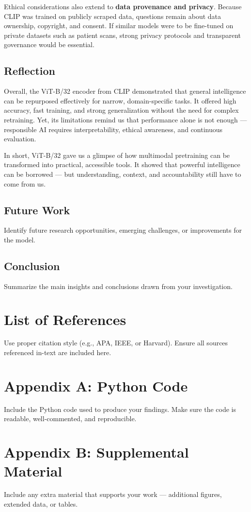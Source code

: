 \documentclass[12pt]{article}
\begin{document}
Ethical considerations also extend to \textbf{data provenance and privacy}. Because CLIP was trained on publicly scraped data, questions remain about data ownership, copyright, and consent. If similar models were to be fine-tuned on private datasets such as patient scans, strong privacy protocols and transparent governance would be essential.

\subsection{Reflection}
Overall, the ViT-B/32 encoder from CLIP demonstrated that general intelligence can be repurposed effectively for narrow, domain-specific tasks. It offered high accuracy, fast training, and strong generalization without the need for complex retraining. Yet, its limitations remind us that performance alone is not enough — responsible AI requires interpretability, ethical awareness, and continuous evaluation.  
\vspace{0.3em}

In short, ViT-B/32 gave us a glimpse of how multimodal pretraining can be transformed into practical, accessible tools. It showed that powerful intelligence can be borrowed — but understanding, context, and accountability still have to come from us.

\subsection{Future Work}
Identify future research opportunities, emerging challenges, or improvements for the model.

\subsection{Conclusion}
Summarize the main insights and conclusions drawn from your investigation.

\newpage
\section*{List of References}
Use proper citation style (e.g., APA, IEEE, or Harvard).  
Ensure all sources referenced in-text are included here.

\appendix

\section{Appendix A: Python Code}
Include the Python code used to produce your findings.  
Make sure the code is readable, well-commented, and reproducible.

\section{Appendix B: Supplemental Material}
Include any extra material that supports your work — additional figures, extended data, or tables.
\end{document}
